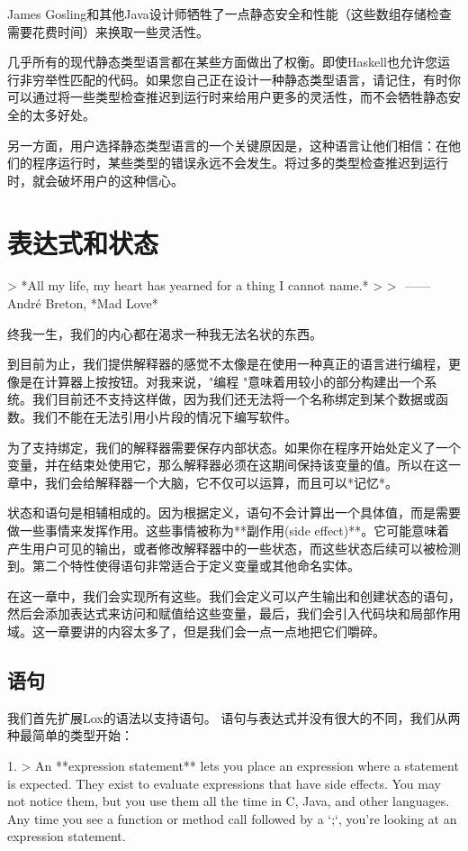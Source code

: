 \documentclass[cn,11pt,chinese]{elegantbook}
\begin{document}
James Gosling和其他Java设计师牺牲了一点静态安全和性能（这些数组存储检查需要花费时间）来换取一些灵活性。

几乎所有的现代静态类型语言都在某些方面做出了权衡。即使Haskell也允许您运行非穷举性匹配的代码。如果您自己正在设计一种静态类型语言，请记住，有时你可以通过将一些类型检查推迟到运行时来给用户更多的灵活性，而不会牺牲静态安全的太多好处。

另一方面，用户选择静态类型语言的一个关键原因是，这种语言让他们相信：在他们的程序运行时，某些类型的错误永远不会发生。将过多的类型检查推迟到运行时，就会破坏用户的这种信心。

\chapter{表达式和状态}

> *All my life, my heart has yearned for a thing I cannot name.*
>
> ​																																		——    André Breton, *Mad Love*

终我一生，我们的内心都在渴求一种我无法名状的东西。

到目前为止，我们提供解释器的感觉不太像是在使用一种真正的语言进行编程，更像是在计算器上按按钮。对我来说，"编程 "意味着用较小的部分构建出一个系统。我们目前还不支持这样做，因为我们还无法将一个名称绑定到某个数据或函数。我们不能在无法引用小片段的情况下编写软件。

为了支持绑定，我们的解释器需要保存内部状态。如果你在程序开始处定义了一个变量，并在结束处使用它，那么解释器必须在这期间保持该变量的值。所以在这一章中，我们会给解释器一个大脑，它不仅可以运算，而且可以*记忆*。

状态和语句是相辅相成的。因为根据定义，语句不会计算出一个具体值，而是需要做一些事情来发挥作用。这些事情被称为**副作用(side effect)**。它可能意味着产生用户可见的输出，或者修改解释器中的一些状态，而这些状态后续可以被检测到。第二个特性使得语句非常适合于定义变量或其他命名实体。

在这一章中，我们会实现所有这些。我们会定义可以产生输出和创建状态的语句，然后会添加表达式来访问和赋值给这些变量，最后，我们会引入代码块和局部作用域。这一章要讲的内容太多了，但是我们会一点一点地把它们嚼碎。

\section{语句}

我们首先扩展Lox的语法以支持语句。 语句与表达式并没有很大的不同，我们从两种最简单的类型开始：

1. > An **expression statement** lets you place an expression where a statement is expected. They exist to evaluate expressions that have side effects. You may not notice them, but you use them all the time in C, Java, and other languages. Any time you see a function or method call followed by a `;`, you’re looking at an expression statement.
\end{document}
